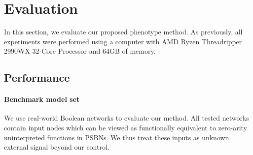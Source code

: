 \section{Evaluation}
\label{sec:phen_control_evaluation}

In this section, we evaluate our proposed phenotype method. 
As previously, all experiments were performed using a computer with AMD Ryzen Threadripper 2990WX 32-Core Processor and 64GB of memory.

\subsection{Performance}

\paragraph{Benchmark model set} We use real-world Boolean networks to evaluate our method. All tested networks contain input nodes which can be viewed as functionally equivalent to zero-arity uninterpreted functions in PSBNs. We thus treat these inputs as unknown external signal beyond our control. 

